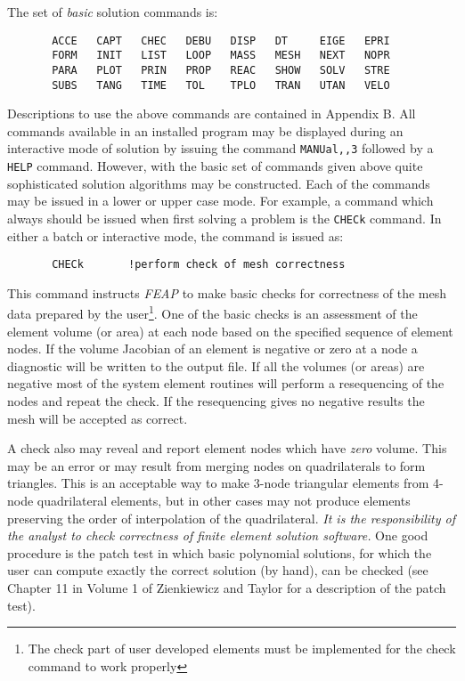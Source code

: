 The set of {\it basic} solution commands is:
\begin{verbatim}
       ACCE   CAPT   CHEC   DEBU   DISP   DT     EIGE   EPRI
       FORM   INIT   LIST   LOOP   MASS   MESH   NEXT   NOPR
       PARA   PLOT   PRIN   PROP   REAC   SHOW   SOLV   STRE
       SUBS   TANG   TIME   TOL    TPLO   TRAN   UTAN   VELO
\end{verbatim}
Descriptions to use the above commands are contained in Appendix B.
All commands available in an installed program may be displayed during
an interactive mode of solution by issuing
the command {\tt MANUal,,3} followed by a {\tt HELP} command.
However, with the basic
set of commands given above quite sophisticated solution algorithms may
be constructed.  Each of the commands may be issued in a
lower or upper case mode.  For example, a command which
always should be issued when first solving a problem
is the {\tt CHECk} command.  In either a batch or interactive mode,
the command is issued as:
\begin{verbatim}
       CHECk       !perform check of mesh correctness
\end{verbatim}
This command instructs {\sl FEAP} to make
basic checks for correctness of the mesh data prepared by the user{\footnote
{The check part of user developed elements must be implemented for the
check command to work properly}}.
One of the basic checks is an assessment of the element volume (or area)
at each node based on the specified sequence of
element nodes.  If the volume Jacobian of an element is negative or zero
at a node a diagnostic will be written to the output file.  If
all the volumes (or areas) are negative most of the system element routines
will perform a resequencing of the nodes and repeat the check.
If the resequencing gives no negative results the mesh will be
accepted as correct.

A check
also may reveal and report element nodes which have {\it zero} volume.
This may be an error or may result from merging nodes on quadrilaterals
to form triangles.  This is an acceptable way to make 3-node triangular
elements from 4-node quadrilateral elements, but in other cases may not
produce elements preserving the order of interpolation of the quadrilateral.
{\it It is the responsibility of the analyst to check correctness of finite
element solution software.} One good procedure is the patch test in which
basic polynomial solutions, for which the user can compute exactly the correct
solution (by hand), can be checked (see Chapter 11 in Volume 1 of
Zienkiewicz and Taylor for a description of the patch test).

